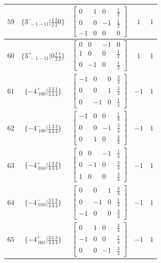 \documentclass[fleqn,8pt]{jsarticle}
\begin{document}
\begin{longtable}{ccccc}
$ 59 $ & $ \{3^{-}_{\,\,-1-11}|\frac{1}{2} \frac{1}{2} 0\} $ & $ \begin{bmatrix} 0 & 1 & 0 & \frac{1}{2} \\ 0 & 0 & -1 & \frac{1}{2} \\ -1 & 0 & 0 & 0 \end{bmatrix} $ & $ 1 $ & $ 1 $ \\ \hline
$ 60 $ & $ \{3^{+}_{\,\,-1-11}|0 \frac{1}{2} \frac{1}{2}\} $ & $ \begin{bmatrix} 0 & 0 & -1 & 0 \\ 1 & 0 & 0 & \frac{1}{2} \\ 0 & -1 & 0 & \frac{1}{2} \end{bmatrix} $ & $ 1 $ & $ 1 $ \\ \hline
$ 61 $ & $ \{-4^{+}_{\,\,100}|\frac{3}{4} \frac{3}{4} \frac{1}{4}\} $ & $ \begin{bmatrix} -1 & 0 & 0 & \frac{3}{4} \\ 0 & 0 & 1 & \frac{3}{4} \\ 0 & -1 & 0 & \frac{1}{4} \end{bmatrix} $ & $ -1 $ & $ 1 $ \\ \hline
$ 62 $ & $ \{-4^{-}_{\,\,100}|\frac{1}{4} \frac{3}{4} \frac{3}{4}\} $ & $ \begin{bmatrix} -1 & 0 & 0 & \frac{1}{4} \\ 0 & 0 & -1 & \frac{3}{4} \\ 0 & 1 & 0 & \frac{3}{4} \end{bmatrix} $ & $ -1 $ & $ 1 $ \\ \hline
$ 63 $ & $ \{-4^{+}_{\,\,010}|\frac{1}{4} \frac{3}{4} \frac{3}{4}\} $ & $ \begin{bmatrix} 0 & 0 & -1 & \frac{1}{4} \\ 0 & -1 & 0 & \frac{3}{4} \\ 1 & 0 & 0 & \frac{3}{4} \end{bmatrix} $ & $ -1 $ & $ 1 $ \\ \hline
$ 64 $ & $ \{-4^{-}_{\,\,010}|\frac{3}{4} \frac{1}{4} \frac{3}{4}\} $ & $ \begin{bmatrix} 0 & 0 & 1 & \frac{3}{4} \\ 0 & -1 & 0 & \frac{1}{4} \\ -1 & 0 & 0 & \frac{3}{4} \end{bmatrix} $ & $ -1 $ & $ 1 $ \\ \hline
$ 65 $ & $ \{-4^{+}_{\,\,001}|\frac{3}{4} \frac{1}{4} \frac{3}{4}\} $ & $ \begin{bmatrix} 0 & 1 & 0 & \frac{3}{4} \\ -1 & 0 & 0 & \frac{1}{4} \\ 0 & 0 & -1 & \frac{3}{4} \end{bmatrix} $ & $ -1 $ & $ 1 $ \\ \hline

\end{longtable}
\end{document}
